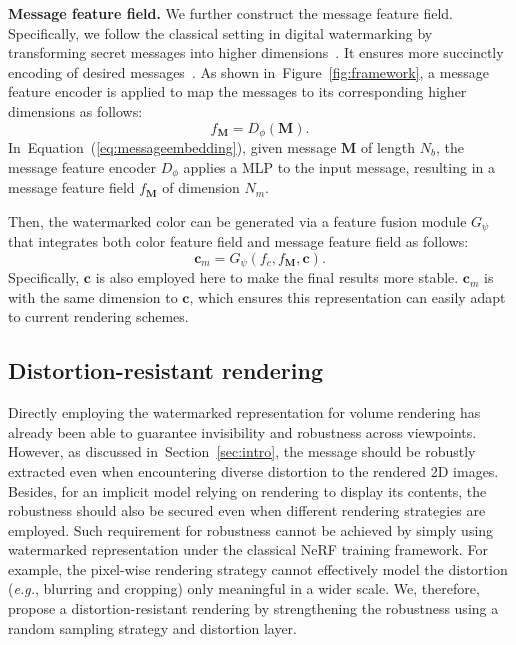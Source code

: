 \documentclass[10pt,twocolumn,letterpaper]{article}
\def\eg{{\emph{e.g.}}}
\newcommand{\Eref}[1]{Equation~(\ref{#1})}
\newcommand{\Fref}[1]{Figure~\ref{#1}}
\newcommand{\Sref}[1]{Section~\ref{#1}}
\def\eg{\emph{e.g.}}
\def\eg{{\emph{e.g.}}}
\def\M{{\mathbf{M}}}
\begin{document}
\noindent\textbf{Message feature field.} We further construct the message feature field. Specifically, we follow the classical setting in digital watermarking by transforming secret messages into higher dimensions~\cite{NIPS2017_838e8afb, baluja2019hiding}. It ensures more succinctly encoding of desired messages~\cite{NIPS2017_838e8afb}. As shown in~\Fref{fig:framework}, a message feature encoder is applied to map the messages to its corresponding higher dimensions as follows:
\begin{equation}
f_\M=D_{\phi}(\M).
\label{eq:messageembedding}
\end{equation}
In~\Eref{eq:messageembedding}, given message $\M$ of length $N_b$, the message feature encoder $D_{\phi}$ applies a MLP to the input message, resulting in a message feature field $f_\M$ of dimension $N_{m}$. 

Then, the watermarked color can be generated via a feature fusion module $G_{\psi}$ that integrates both color feature field and message feature field as follows: 
\begin{equation}
\mathbf{c}_m=G_{\psi}(f_c,f_\M,\mathbf{c}).
\label{eq:messagerepresentation}
\end{equation}
Specifically, $\mathbf{c}$ is also employed here to make the final results more stable. $\mathbf{c}_m$ is with the same dimension to $\mathbf{c}$, which ensures this representation can easily adapt to current rendering schemes.

\subsection{Distortion-resistant rendering}
\label{sec:4.2}
Directly employing the watermarked representation for volume rendering has already been able to guarantee invisibility and robustness across viewpoints. However, as discussed in~\Sref{sec:intro}, the message should be robustly extracted even when encountering diverse distortion to the rendered 2D images. Besides, for an implicit model relying on rendering to display its contents, the robustness should also be secured even when different rendering strategies are employed. Such requirement for robustness cannot be achieved by simply using  watermarked representation under the classical NeRF training framework. For example, the pixel-wise rendering strategy cannot effectively model the distortion (\eg, blurring and cropping) only meaningful in a wider scale. We, therefore, propose a distortion-resistant rendering by strengthening the robustness using a random sampling strategy and distortion layer.
\end{document}
